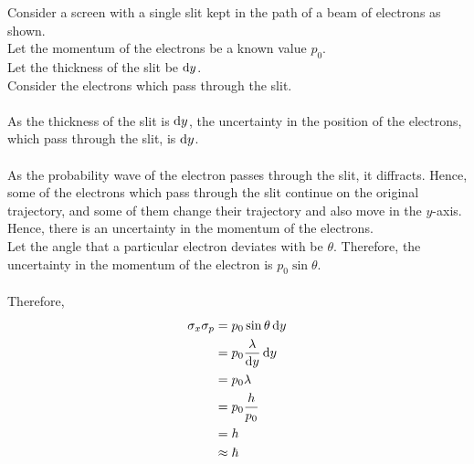 \documentclass[titlepage, fleqn, a4paper, 12pt, twoside]{article}
\theoremstyle{definition}
\theoremstyle{theorem}
\begin{document}
\begin{figure}[H]
\end{figure}

Consider a screen with a single slit kept in the path of a beam of electrons as shown.\\
Let the momentum of the electrons be a known value $p_0$.\\
Let the thickness of the slit be $\dif y$.\\
Consider the electrons which pass through the slit.\\
~\\
As the thickness of the slit is $\dif y$, the uncertainty in the position of the electrons, which pass through the slit, is $\dif y$.\\
~\\
As the probability wave of the electron passes through the slit, it diffracts.
Hence, some of the electrons which pass through the slit continue on the original trajectory, and some of them change their trajectory and also move in the $y$-axis.
Hence, there is an uncertainty in the momentum of the electrons.\\
Let the angle that a particular electron deviates with be $\theta$.
Therefore, the uncertainty in the momentum of the electron is $p_0 \sin \theta$.\\
~\\
Therefore,
\begin{align*}
	\sigma_x \sigma_p &= p_0 \sin \theta \dif y\\
	&= p_0 \frac{\lambda}{\dif y} \dif y\\
	&= p_0 \lambda\\
	&= p_0 \frac{h}{p_0}\\
	&= h\\
	&\approx \hbar
\end{align*}
\end{document}
